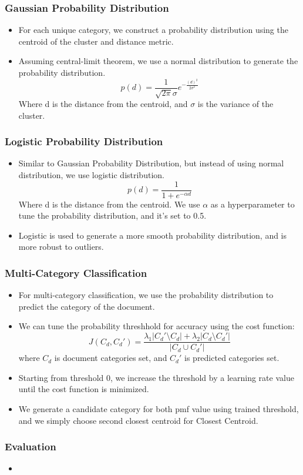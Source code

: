 \documentclass[
    10pt %
    16:9, %
]{beamer}
\begin{document}
\begin{frame}
  \frametitle{Gaussian Probability Distribution}
  \begin{itemize}
    \item For each unique category, we construct a probability distribution using the centroid of the cluster and distance metric.
    \item Assuming central-limit theorem, we use a normal distribution to generate the probability distribution.
    \[
      p(d) = \frac{1}{\sqrt{2\pi}\sigma}e^{-\frac{(d)^2}{2\sigma^2}}
    \]
    Where d is the distance from the centroid, and \(\sigma\) is the variance of the cluster.
  \end{itemize}
\end{frame}

\begin{frame}
  \frametitle{Logistic Probability Distribution}
  \begin{itemize}
    \item Similar to Gaussian Probability Distribution, but instead of using normal distribution, we use logistic distribution.
    \[
      p(d) = \frac{1}{1+e^{-\alpha d}}
    \]
    Where d is the distance from the centroid. We use $\alpha$ as a hyperparameter to tune the probability distribution, and it's set to 0.5.
    \item Logistic is used to generate a more smooth probability distribution, and is more robust to outliers.
  \end{itemize}
\end{frame}

\begin{frame}
  \frametitle{Multi-Category Classification}
  \begin{itemize}
    \item For multi-category classification, we use the probability distribution to predict the category of the document.
    \item We can tune the probability threshhold for accuracy using the cost function:
    \[
      J(C_d, C_d') = \frac{\lambda_1|C_d'\setminus C_d| + \lambda_2|C_d\setminus C_d'|}{|C_d\cup C_d'|}
    \]
    where $C_d$ is document categories set, and $C_d'$ is predicted categories set.
    \item Starting from threshold 0, we increase the threshold by a learning rate value until the cost function is minimized.
    \item We generate a candidate category for both pmf value using trained threshold, and we simply choose second closest centroid for Closest Centroid.
  \end{itemize}
\end{frame}

\begin{frame}
  \frametitle{Evaluation}
  \begin{itemize}
    \item 
  \end{itemize}
\end{frame}
\end{document}
